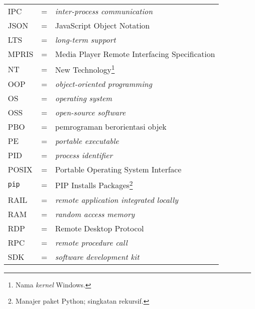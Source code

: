 \begin{longtable}{llp{3in}}
    IPC & \hspace{1.5cm} = & \textit{inter-process communication}\\
    JSON & \hspace{1.5cm} = & JavaScript Object Notation\\
    LTS & \hspace{1.5cm} = & \textit{long-term support}\\
    MPRIS & \hspace{1.5cm} = & Media Player Remote Interfacing Specification\\
    NT & \hspace{1.5cm} = & New Technology\footnote{Nama \textit{kernel} Windows.}\\
    OOP & \hspace{1.5cm} = & \textit{object-oriented programming}\\
    OS & \hspace{1.5cm} = & \textit{operating system}\\
    OSS & \hspace{1.5cm} = & \textit{open-source software}\\
    PBO & \hspace{1.5cm} = & pemrograman berorientasi objek\\
    PE & \hspace{1.5cm} = & \textit{portable executable}\\
    PID & \hspace{1.5cm} = & \textit{process identifier}\\
    POSIX & \hspace{1.5cm} = & Portable Operating System Interface\\
    \verb|pip| & \hspace{1.5cm} = & PIP Installs Packages\footnote{Manajer paket Python; singkatan rekursif.}\\
    RAIL & \hspace{1.5cm} = & \textit{remote application integrated locally}\\
    RAM & \hspace{1.5cm} = & \textit{random access memory}\\
    RDP & \hspace{1.5cm} = & Remote Desktop Protocol\\
    RPC & \hspace{1.5cm} = & \textit{remote procedure call}\\
    SDK & \hspace{1.5cm} = & \textit{software development kit}\\

\end{longtable}
